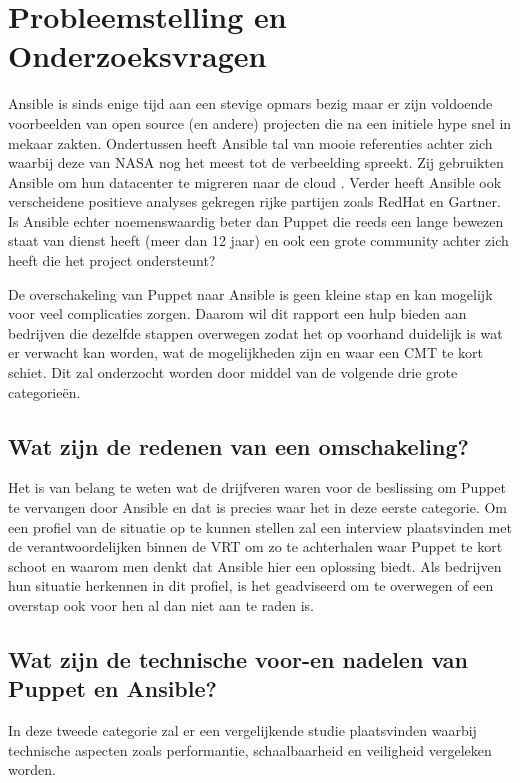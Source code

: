 \section{Probleemstelling en Onderzoeksvragen}
\label{sec:onderzoeksvragen}

Ansible is sinds enige tijd aan een stevige opmars bezig maar er zijn voldoende voorbeelden van open source (en andere) projecten die na een initiele hype snel in mekaar zakten. Ondertussen heeft Ansible tal van mooie referenties achter zich waarbij deze van NASA nog het meest tot de verbeelding spreekt. Zij gebruikten Ansible om hun datacenter te migreren naar de cloud \autocite{nacasestudy}.  Verder heeft Ansible ook verscheidene positieve analyses gekregen rijke partijen zoals RedHat en Gartner. Is Ansible echter noemenswaardig beter dan Puppet die reeds een lange bewezen staat van dienst heeft (meer dan 12 jaar) en ook een grote community achter zich heeft die het project ondersteunt?

De overschakeling van Puppet naar Ansible is geen kleine stap en kan mogelijk voor veel complicaties zorgen. Daarom wil dit rapport een hulp bieden aan bedrijven die dezelfde stappen overwegen zodat het op voorhand duidelijk is wat er verwacht kan worden, wat de mogelijkheden zijn en waar een \gls{CMT} te kort schiet. Dit zal onderzocht worden door middel van de volgende drie grote categorie\"en. 


\subsection{Wat zijn de redenen van een omschakeling?}

Het is van belang te weten wat de drijfveren waren voor de beslissing om Puppet te vervangen door Ansible en dat is precies waar het in deze eerste categorie. Om een profiel van de situatie op te kunnen stellen zal een interview plaatsvinden met de verantwoordelijken binnen de VRT om zo te achterhalen waar Puppet te kort schoot en waarom men denkt dat Ansible hier een oplossing biedt. Als bedrijven hun situatie herkennen in dit profiel, is het geadviseerd om te overwegen of een overstap ook voor hen al dan niet aan te raden is.

\subsection{Wat zijn de technische voor-en nadelen van Puppet en Ansible?}

In deze tweede categorie zal er een vergelijkende studie plaatsvinden waarbij technische aspecten zoals performantie, schaalbaarheid en veiligheid vergeleken worden. 
 

